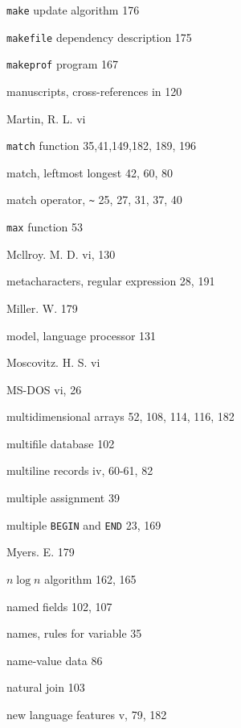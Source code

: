 \begin{multicols}{3}
\hangindent=3pc  \verb'make' update algorithm 176

\hangindent=3pc  \verb'makefile' dependency description 175

\hangindent=3pc  \verb'makeprof' program 167

\hangindent=3pc  manuscripts, cross-references in 120

\hangindent=3pc  Martin, R. L. vi

\hangindent=3pc  \verb'match' function 35,41,149,182, 189, 196

\hangindent=3pc  match, leftmost longest 42, 60, 80

\hangindent=3pc  match operator, \verb'~' 25, 27, 31, 37, 40

\hangindent=3pc  \verb'max' function 53

\hangindent=3pc  Mcllroy. M. D. vi, 130

\hangindent=3pc  metacharacters, regular expression 28, 191

\hangindent=3pc  Miller. W. 179

\hangindent=3pc  model, language processor 131

\hangindent=3pc  Moscovitz. H. S. vi

\hangindent=3pc  MS-DOS vi, 26

\hangindent=3pc  multidimensional arrays 52, 108, 114, 116, 182

\hangindent=3pc  multifile database 102

\hangindent=3pc  multiline records iv, 60-61, 82

\hangindent=3pc  multiple assignment 39

\hangindent=3pc  multiple \verb'BEGIN' and \verb'END' 23, 169

\hangindent=3pc  Myers. E. 179

\hangindent=3pc  $n \log n$ algorithm 162, 165

\hangindent=3pc  named fields 102, 107

\hangindent=3pc  names, rules for variable 35

\hangindent=3pc  name-value data 86

\hangindent=3pc  natural join 103

\hangindent=3pc  new language features v, 79, 182


\end{multicols}
